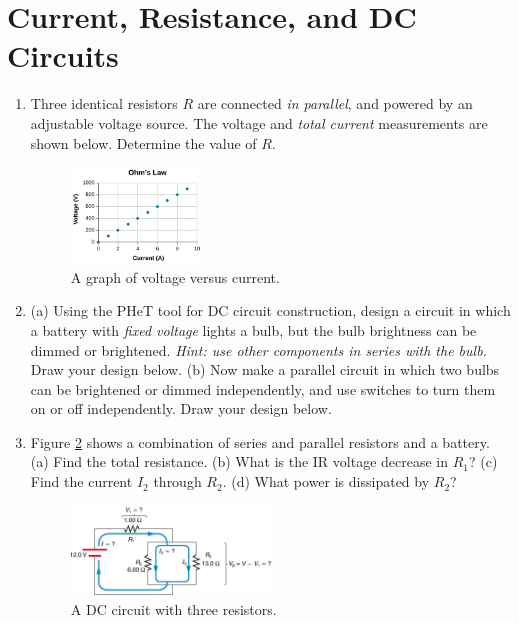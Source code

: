 \documentclass[10pt]{article}
\begin{document}
\section{Current, Resistance, and DC Circuits}

\begin{enumerate}

\item Three identical resistors $R$ are connected \textit{in parallel}, and powered by an adjustable voltage source. The voltage and \textit{total current} measurements are shown below. Determine the value of $R$.

\begin{figure}[hb]
\centering
\includegraphics[width=0.33\textwidth]{figures/ohm1.png}
\caption{\label{fig:ohm1} A graph of voltage versus current.}
\end{figure}

\vspace{1cm}
\item (a) Using the PHeT tool for DC circuit construction, design a circuit in which a battery with \textit{fixed voltage} lights a bulb, but the bulb brightness can be dimmed or brightened.  \textit{Hint: use other components in series with the bulb.} Draw your design below. (b) Now make a parallel circuit in which two bulbs can be brightened or dimmed independently, and use switches to turn them on or off independently.  Draw your design below. \\ \vspace{3cm}

\clearpage

\item Figure \ref{fig:ohm2} shows a combination of series and parallel resistors and a battery. (a) Find the total resistance. (b) What is the IR voltage decrease in $R_1$? (c) Find the current $I_2$ through $R_2$. (d) What power is dissipated by $R_2$?

\begin{figure}
\centering
\includegraphics[width=0.5\textwidth]{figures/circuit.jpeg}
\caption{\label{fig:ohm2} A DC circuit with three resistors.}
\end{figure}
\end{enumerate}
\end{document}
